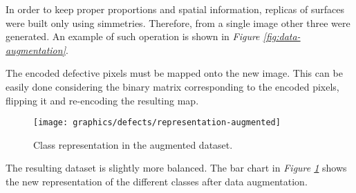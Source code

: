         \par{
            In order to keep proper proportions and spatial information, replicas of surfaces were built only using simmetries. Therefore, from a single image other three were generated. An example of such operation is shown in \emph{Figure \ref{fig:data-augmentation}}.
        }
        \par{
            The encoded defective pixels must be mapped onto the new image. This can be easily done considering the binary matrix corresponding to the encoded pixels, flipping it and re-encoding the resulting map.
        }
        \begin{figure}
            \texttt{[image: graphics/defects/representation-augmented]}
            \caption{Class representation in the augmented dataset.}\label{fig:defects:representation-augmented}
        \end{figure}
        \par{
            The resulting dataset is slightly more balanced. The bar chart in \emph{Figure \ref{fig:defects:representation-augmented}} shows the new representation of the different classes after data augmentation.
        }